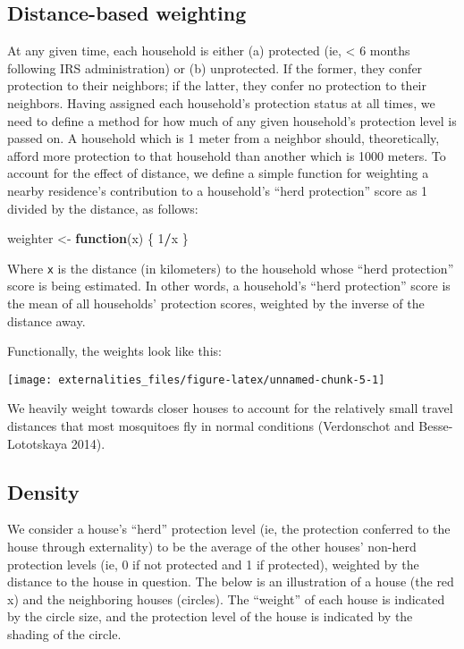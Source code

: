 \documentclass[]{article}
\newenvironment{Shaded}{\begin{snugshade}}{\end{snugshade}}
\newcommand{\DecValTok}[1]{\textcolor[rgb]{0.00,0.00,0.81}{#1}}
\newcommand{\StringTok}[1]{\textcolor[rgb]{0.31,0.60,0.02}{#1}}
\newcommand{\ControlFlowTok}[1]{\textcolor[rgb]{0.13,0.29,0.53}{\textbf{#1}}}
\newcommand{\OperatorTok}[1]{\textcolor[rgb]{0.81,0.36,0.00}{\textbf{#1}}}
\newcommand{\NormalTok}[1]{#1}
\begin{document}
\subsection{Distance-based weighting}\label{distance-based-weighting}

At any given time, each household is either (a) protected (ie,
\textless{} 6 months following IRS administration) or (b) unprotected.
If the former, they confer protection to their neighbors; if the latter,
they confer no protection to their neighbors. Having assigned each
household's protection status at all times, we need to define a method
for how much of any given household's protection level is passed on. A
household which is 1 meter from a neighbor should, theoretically, afford
more protection to that household than another which is 1000 meters. To
account for the effect of distance, we define a simple function for
weighting a nearby residence's contribution to a household's ``herd
protection'' score as 1 divided by the distance, as follows:

\begin{Shaded}
\begin{Highlighting}[]
\NormalTok{weighter <-}\StringTok{ }\ControlFlowTok{function}\NormalTok{(x) \{}
    \DecValTok{1}\OperatorTok{/}\NormalTok{x}
\NormalTok{\}}
\end{Highlighting}
\end{Shaded}

Where \texttt{x} is the distance (in kilometers) to the household whose
``herd protection'' score is being estimated. In other words, a
household's ``herd protection'' score is the mean of all households'
protection scores, weighted by the inverse of the distance away.

Functionally, the weights look like this:

\begin{center}\texttt{[image: externalities\_files/figure-latex/unnamed-chunk-5-1]} \end{center}

We heavily weight towards closer houses to account for the relatively
small travel distances that most mosquitoes fly in normal conditions
(Verdonschot and Besse-Lototskaya 2014).

\subsection{Density}\label{density}

We consider a house's ``herd'' protection level (ie, the protection
conferred to the house through externality) to be the average of the
other houses' non-herd protection levels (ie, 0 if not protected and 1
if protected), weighted by the distance to the house in question. The
below is an illustration of a house (the red x) and the neighboring
houses (circles). The ``weight'' of each house is indicated by the
circle size, and the protection level of the house is indicated by the
shading of the circle.
\end{document}
